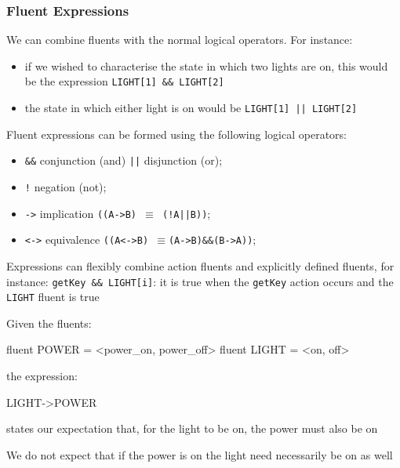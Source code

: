 \subsubsection{Fluent Expressions}\label{sub:an_fluent_expressions} %
We can combine fluents with the normal logical operators.
For instance:
\begin{itemize}
    \item if we wished to characterise the state in which two lights are on, this would be the expression \texttt{LIGHT[1] \&\& LIGHT[2]}
    \item the state in which either light is on would be \texttt{LIGHT[1] || LIGHT[2]}
\end{itemize}
Fluent expressions can be formed using the following logical operators:
\begin{itemize}
    \item \texttt{\&\&} conjunction (and) \texttt{||} disjunction (or);
    \item \texttt{!} negation (not);
    \item \texttt{->} implication \texttt{((A->B) $\equiv$ (!A||B))};
    \item \texttt{<->} equivalence \texttt{((A<->B) $\equiv$(A->B)\&\&(B->A))};
\end{itemize}
\begin{note}
    Expressions can flexibly combine action fluents and explicitly defined fluents, for instance: \texttt{getKey \&\& LIGHT[i]}: it is true when the \texttt{getKey} action occurs and the \texttt{LIGHT} fluent is true
\end{note}
\begin{example}{}{}
    Given the fluents:
    \begin{codeblock}[fsp]{}
    fluent POWER = <power_on, power_off>
    fluent LIGHT = <on, off>
    \end{codeblock}
    the expression:
    \begin{codeblock}[fsp]{}
    LIGHT->POWER
    \end{codeblock}
    states our expectation that, for the light to be on, the power must also be on
    \begin{warning}
        We do not expect that if the power is on the light need necessarily be on as well
    \end{warning}
\end{example}
%
